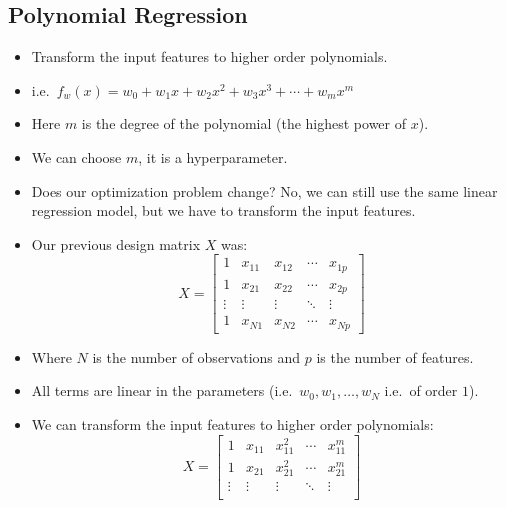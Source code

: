 \documentclass[12pt]{article}
\begin{document}
        \subsection{Polynomial Regression}
            \begin{itemize}
                \item Transform the input features to higher order polynomials.
                \item i.e.\ $f_w(x) = w_0 + w_1x + w_2x^2 + w_3x^3 + \cdots + {w_m}x^m$
                \item Here $m$ is the degree of the polynomial (the highest power of $x$).
                \item We can choose $m$, it is a hyperparameter.
                \item Does our optimization problem change? No, we can still use the same linear regression model, but we have to transform the input features.
                \item Our previous design matrix $X$ was:
                \begin{equation}
                    X = \begin{bmatrix}
                        1 & x_{11} & x_{12} & \cdots & x_{1p} \\
                        1 & x_{21} & x_{22} & \cdots & x_{2p} \\
                        \vdots & \vdots & \vdots & \ddots & \vdots \\
                        1 & x_{N1} & x_{N2} & \cdots & x_{Np}
                    \end{bmatrix}
                \end{equation}
                \item Where $N$ is the number of observations and $p$ is the number of features.
                \item All terms are linear in the parameters (i.e.\ $w_0, w_1, \ldots, w_N$ i.e.\ of order $1$).
                \item We can transform the input features to higher order polynomials:
                \begin{equation}
                    X = \begin{bmatrix}
                        1 & x_{11} & x_{11}^2 & \cdots & x_{11}^m \\
                        1 & x_{21} & x_{21}^2 & \cdots & x_{21}^m \\
                        \vdots & \vdots & \vdots & \ddots & \vdots \\

\end{bmatrix}
\end{equation}
\end{itemize}
\end{document}
